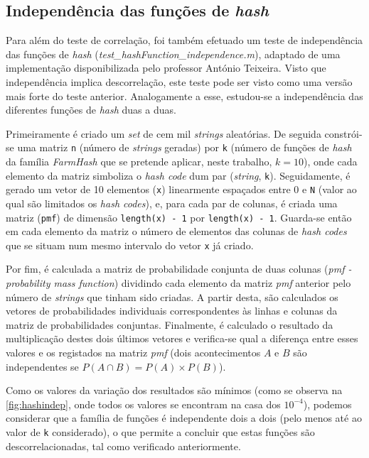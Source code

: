 \documentclass[a4paper,11pt,openright,oneside]{report}
\begin{document}
\subsection{Independência das funções de \textit{hash}}
\label{subsec.hashindep}

Para além do teste de correlação, foi também efetuado um teste de independência das funções de \textit{hash} (\textit{test\_hashFunction\_independence.m}), adaptado de uma implementação disponibilizada pelo professor António Teixeira. Visto que independência implica descorrelação, este teste pode ser visto como uma versão mais forte do teste anterior. Analogamente a esse, estudou-se a independência das diferentes funções de \textit{hash} duas a duas.

Primeiramente é criado um \textit{set} de cem mil \textit{strings} aleatórias. De seguida constrói-se uma matriz \texttt{n} (número de \textit{strings} geradas) por \texttt{k} (número de funções de \textit{hash} da família \textit{FarmHash} que se pretende aplicar, neste trabalho, $k = 10$),  onde cada elemento da matriz simboliza o \textit{hash code} dum par (\textit{string}, \texttt{k}). Seguidamente, é gerado um vetor de 10 elementos (\texttt{x}) linearmente espaçados entre 0 e \texttt{N} (valor ao qual são limitados os \textit{hash codes}), e, para cada par de colunas, é criada uma matriz (\texttt{pmf}) de dimensão \verb|length(x) - 1| por \verb|length(x) - 1|. Guarda-se então em cada elemento da matriz o número de elementos das colunas de \textit{hash codes} que se situam num mesmo intervalo do vetor \texttt{x} já criado.

Por fim, é calculada a matriz de probabilidade conjunta de duas colunas (\textit{pmf - probability mass function}) dividindo cada elemento da matriz \textit{pmf} anterior pelo número de \textit{strings} que tinham sido criadas. A partir desta, são calculados os vetores de probabilidades individuais correspondentes às linhas e colunas da matriz de probabilidades conjuntas. Finalmente, é calculado o resultado da multiplicação destes dois últimos vetores e verifica-se qual a diferença entre esses valores e os registados na matriz \textit{pmf} (dois acontecimentos $A$ e $B$ são independentes se $P(A\cap B) = P(A) \times P(B)$).

Como os valores da variação dos resultados são mínimos (como se observa na \autoref{fig:hashindep}, onde todos os valores se encontram na casa dos $10^{-4}$), podemos considerar que a família de funções é independente dois a dois (pelo menos até ao valor de \texttt{k} considerado), o que permite a concluir que estas funções são descorrelacionadas, tal como verificado anteriormente.
\end{document}
